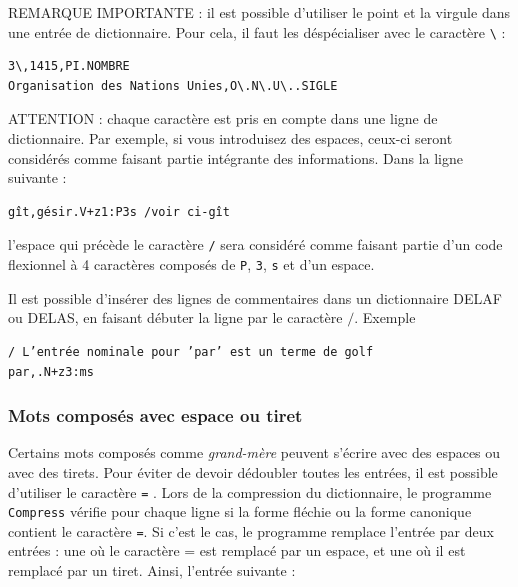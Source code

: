 \bigskip
\noindent REMARQUE IMPORTANTE : il est possible d’utiliser le point et la virgule dans une
entrée de dictionnaire. Pour cela, il faut les déspécialiser avec le caractère
\verb+\+ \index{\verb+\,+}\index{\verb+\.+}\index{\verb+\+}:

\bigskip
\begin{verbatim}
3\,1415,PI.NOMBRE
Organisation des Nations Unies,O\.N\.U\..SIGLE
\end{verbatim}


\bigskip
\noindent ATTENTION : chaque caractère est pris en compte dans une ligne de dictionnaire. Par
exemple, si vous introduisez des espaces, ceux-ci seront considérés comme faisant partie
intégrante des informations. Dans la ligne suivante :


\begin{verbatim}
gît,gésir.V+z1:P3s /voir ci-gît
\end{verbatim}

\bigskip \noindent l’espace qui précède le caractère \verb+/+ sera considéré comme faisant partie
d’un code flexionnel à 4 caractères composés de \verb+P+, \verb+3+, \verb+s+ et d’un espace.


\bigskip \noindent Il est possible d’insérer des lignes de commentaires dans un dictionnaire DELAF
ou DELAS, en faisant débuter la ligne par le caractère $/$. Exemple

\bigskip
\begin{verbatim}
/ L’entrée nominale pour ’par’ est un terme de golf
par,.N+z3:ms
\end{verbatim}


\subsubsection{Mots composés avec espace ou tiret}

\index{\verb+=+}\index{\verb+\=+}

Certains mots composés comme \textit{grand-mère} peuvent s’écrire avec des espaces ou avec
des tirets. Pour éviter de devoir dédoubler toutes les entrées, il est possible d’utiliser 
le caractère \verb+=+ . Lors de la compression du dictionnaire, le programme \verb+Compress+
 vérifie pour chaque ligne
si la forme fléchie ou la forme canonique contient le caractère \verb+=+. Si c’est le cas, le
programme remplace l’entrée par deux entrées : une où le caractère = est remplacé par un espace,
et une où il est remplacé par un tiret. Ainsi, l’entrée suivante :


